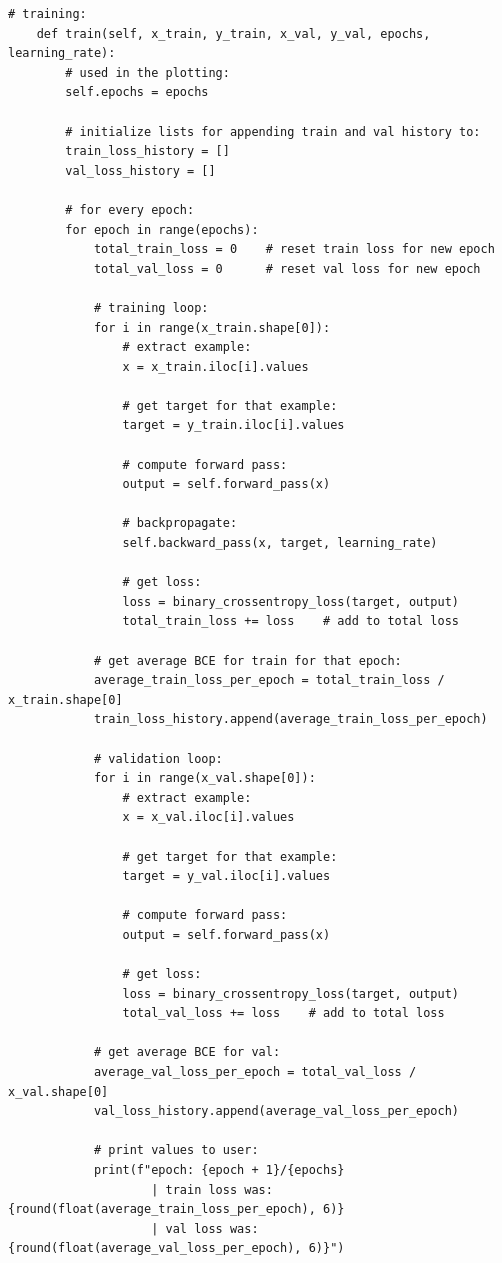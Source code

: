 \documentclass[a4paper]{article}
\begin{document}
\begin{lstlisting}[basicstyle= \scriptsize]
    # training:
    def train(self, x_train, y_train, x_val, y_val, epochs, learning_rate):
        # used in the plotting:
        self.epochs = epochs
        
        # initialize lists for appending train and val history to:
        train_loss_history = []
        val_loss_history = []

        # for every epoch:
        for epoch in range(epochs):
            total_train_loss = 0    # reset train loss for new epoch
            total_val_loss = 0      # reset val loss for new epoch

            # training loop:
            for i in range(x_train.shape[0]):
                # extract example:
                x = x_train.iloc[i].values

                # get target for that example:
                target = y_train.iloc[i].values

                # compute forward pass:
                output = self.forward_pass(x)

                # backpropagate:
                self.backward_pass(x, target, learning_rate)

                # get loss:
                loss = binary_crossentropy_loss(target, output)
                total_train_loss += loss    # add to total loss  

            # get average BCE for train for that epoch:
            average_train_loss_per_epoch = total_train_loss / x_train.shape[0]
            train_loss_history.append(average_train_loss_per_epoch)

            # validation loop:
            for i in range(x_val.shape[0]):
                # extract example:
                x = x_val.iloc[i].values

                # get target for that example:
                target = y_val.iloc[i].values

                # compute forward pass:
                output = self.forward_pass(x)

                # get loss:
                loss = binary_crossentropy_loss(target, output)
                total_val_loss += loss    # add to total loss 
            
            # get average BCE for val:
            average_val_loss_per_epoch = total_val_loss / x_val.shape[0]
            val_loss_history.append(average_val_loss_per_epoch)

            # print values to user:
            print(f"epoch: {epoch + 1}/{epochs} 
                    | train loss was: {round(float(average_train_loss_per_epoch), 6)} 
                    | val loss was: {round(float(average_val_loss_per_epoch), 6)}")  


\end{lstlisting}
\end{document}
